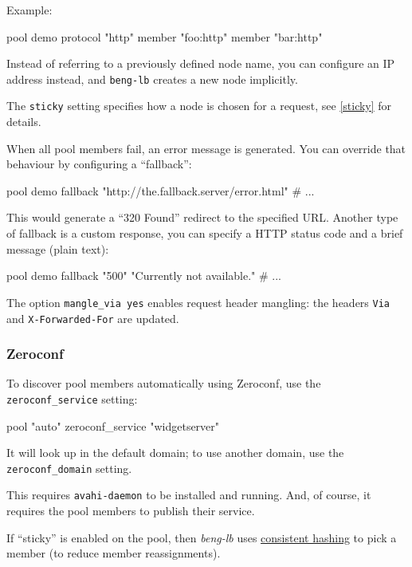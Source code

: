 \documentclass[a4paper,12pt]{article}
\begin{document}
Example:

\begin{verbatim*}
pool demo {
  protocol "http"
  member "foo:http"
  member "bar:http"
}
\end{verbatim*}

Instead of referring to a previously defined node name, you can
configure an IP address instead, and \texttt{beng-lb} creates a new
node implicitly.

The \verb|sticky| setting specifies how a node is chosen for a
request, see \ref{sticky} for details.

When all pool members fail, an error message is generated.  You can
override that behaviour by configuring a ``fallback'':

\begin{verbatim*}
pool demo {
  fallback "http://the.fallback.server/error.html"
  # ...
}
\end{verbatim*}

This would generate a ``320 Found'' redirect to the specified URL.
Another type of fallback is a custom response, you can specify a HTTP
status code and a brief message (plain text):

\begin{verbatim*}
pool demo {
  fallback "500" "Currently not available."
  # ...
}
\end{verbatim*}

The option \texttt{mangle\_via yes} enables request header mangling:
the headers \texttt{Via} and \texttt{X-Forwarded-For} are updated.

\subsubsection{Zeroconf}

To discover pool members automatically using Zeroconf, use the
\verb|zeroconf_service| setting:

\begin{verbatim*}
pool "auto" {
   zeroconf_service "widgetserver"
}
\end{verbatim*}

It will look up in the default domain; to use another domain, use the
\verb|zeroconf_domain| setting.

This requires \texttt{avahi-daemon} to be installed and running.  And,
of course, it requires the pool members to publish their service.

If ``sticky'' is enabled on the pool, then \emph{beng-lb} uses
\href{https://en.wikipedia.org/wiki/Consistent_hashing}{consistent
  hashing} to pick a member (to reduce member reassignments).
\end{document}
